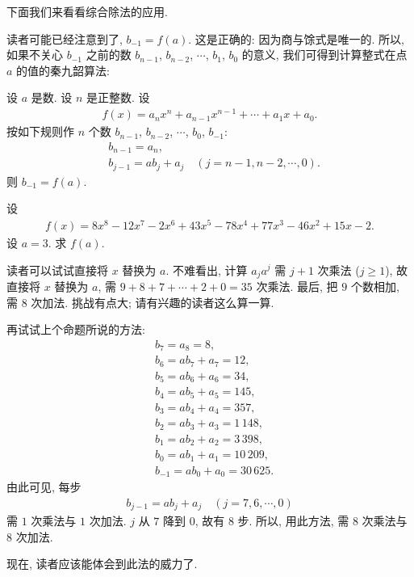 \myLine

下面我们来看看综合除法的应用.

读者可能已经注意到了, $b_{-1} = f(a)$. 这是正确的: 因为商与馀式是唯一的. 所以, 如果不关心 $b_{-1}$ 之前的数 $b_{n-1}$, $b_{n-2}$, $\cdots$, $b_1$, $b_0$ 的意义, 我们可得到计算整式在点 $a$ 的值的秦九韶算法:
\begin{proposition}
    设 $a$ 是数. 设 $n$ 是正整数. 设
    \begin{align*}
        f(x) = a_n x^n + a_{n-1} x^{n-1} + \cdots + a_1 x + a_0.
    \end{align*}
    按如下规则作 $n$ 个数 $b_{n-1}$, $b_{n-2}$, $\cdots$, $b_0$, $b_{-1}$:
    \begin{align*}
         & b_{n-1} = a_n,                                     \\
         & b_{j-1} = ab_j + a_j \quad (j = n-1,n-2,\cdots,0).
    \end{align*}
    则 $b_{-1} = f(a)$.
\end{proposition}

\begin{example}
    设
    \begin{align*}
        f(x) = 8 x^8 - 12 x^7 - 2 x^6 + 43 x^5 - 78 x^4 + 77 x^3 - 46 x^2 + 15 x - 2.
    \end{align*}
    设 $a = 3$. 求 $f(a)$.

    读者可以试试直接将 $x$ 替换为 $a$. 不难看出, 计算 $a_j a^j$ 需 $j + 1$ 次乘法 ($j \geq 1$), 故直接将 $x$ 替换为 $a$, 需 $9 + 8 + 7 + \cdots + 2 + 0 = 35$ 次乘法. 最后, 把 $9$ 个数相加, 需 $8$ 次加法. 挑战有点大; 请有兴趣的读者这么算一算.

    再试试上个命题所说的方法:
    \begin{align*}
         & b_7 = a_8 = 8,                 \\
         & b_6 = ab_7 + a_7 = 12,         \\
         & b_5 = ab_6 + a_6 = 34,         \\
         & b_4 = ab_5 + a_5 = 145,        \\
         & b_3 = ab_4 + a_4 = 357,        \\
         & b_2 = ab_3 + a_3 = 1\,148,     \\
         & b_1 = ab_2 + a_2 = 3\,398,     \\
         & b_0 = ab_1 + a_1 = 10\,209,    \\
         & b_{-1} = ab_0 + a_0 = 30\,625.
    \end{align*}
    由此可见, 每步
    \begin{align*}
        b_{j-1} = ab_j + a_j \quad (j = 7, 6, \cdots, 0)
    \end{align*}
    需 $1$ 次乘法与 $1$ 次加法. $j$ 从 $7$ 降到 $0$, 故有 $8$ 步. 所以, 用此方法, 需 $8$ 次乘法与 $8$ 次加法.

    现在, 读者应该能体会到此法的威力了.
\end{example}

